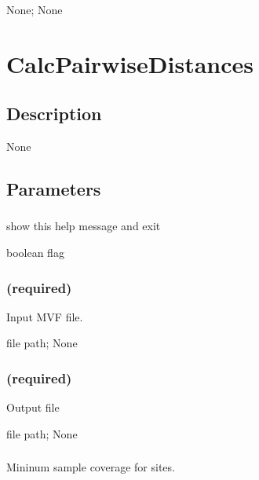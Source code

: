 \documentclass[letterpaper,11pt,english]{sphinxmanual}
\begin{document}
 None;  None


\section{CalcPairwiseDistances}
\label{\detokenize{prog_desc:calcpairwisedistances}}

\subsection{Description}
\label{\detokenize{prog_desc:id58}}
None


\subsection{Parameters}
\label{\detokenize{prog_desc:id59}}

\subsubsection{}
\label{\detokenize{prog_desc:id60}}
 show this help message and exit

 boolean flag


\subsubsection{ (required)}
\label{\detokenize{prog_desc:id61}}
 Input MVF file.

 file path;  None


\subsubsection{ (required)}
\label{\detokenize{prog_desc:id62}}
 Output file

 file path;  None


\subsubsection{}
\label{\detokenize{prog_desc:id63}}
 Mininum sample coverage for sites.
\end{document}
